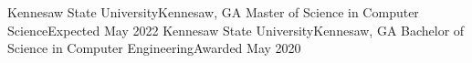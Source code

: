 \educationSubheading
{Kennesaw State University}{Kennesaw, GA}
{Master of Science in Computer Science}{Expected May 2022}
\educationSubheading
{Kennesaw State University}{Kennesaw, GA}
{Bachelor of Science in Computer Engineering}{Awarded May 2020}
